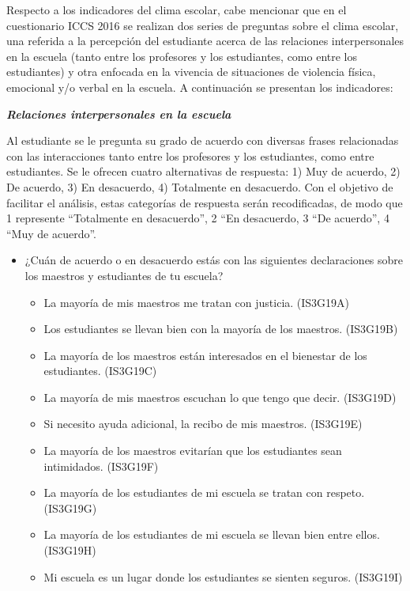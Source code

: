 \documentclass[12pt,twoside]{templates/facsothesis}
\providecommand{\tightlist}{%
  \setlength{\itemsep}{0pt}\setlength{\parskip}{0pt}}
\begin{document}
Respecto a los indicadores del clima escolar, cabe mencionar que en el cuestionario ICCS 2016 se realizan dos series de preguntas sobre el clima escolar, una referida a la percepción del estudiante acerca de las relaciones interpersonales en la escuela (tanto entre los profesores y los estudiantes, como entre los estudiantes) y otra enfocada en la vivencia de situaciones de violencia física, emocional y/o verbal en la escuela. A continuación se presentan los indicadores:

\textbf{\emph{Relaciones interpersonales en la escuela}}

Al estudiante se le pregunta su grado de acuerdo con diversas frases relacionadas con las interacciones tanto entre los profesores y los estudiantes, como entre estudiantes. Se le ofrecen cuatro alternativas de respuesta: 1) Muy de acuerdo, 2) De acuerdo, 3) En desacuerdo, 4) Totalmente en desacuerdo. Con el objetivo de facilitar el análisis, estas categorías de respuesta serán recodificadas, de modo que 1 represente ``Totalmente en desacuerdo'', 2 ``En desacuerdo, 3 ``De acuerdo'', 4 ``Muy de acuerdo''.

\begin{itemize}
\item
  ¿Cuán de acuerdo o en desacuerdo estás con las siguientes declaraciones sobre los maestros y estudiantes de tu escuela?

  \begin{itemize}
  \tightlist
  \item
    La mayoría de mis maestros me tratan con justicia. (IS3G19A)
  \item
    Los estudiantes se llevan bien con la mayoría de los maestros. (IS3G19B)
  \item
    La mayoría de los maestros están interesados en el bienestar de los estudiantes. (IS3G19C)
  \item
    La mayoría de mis maestros escuchan lo que tengo que decir. (IS3G19D)
  \item
    Si necesito ayuda adicional, la recibo de mis maestros. (IS3G19E)
  \item
    La mayoría de los maestros evitarían que los estudiantes sean intimidados. (IS3G19F)
  \item
    La mayoría de los estudiantes de mi escuela se tratan con respeto. (IS3G19G)
  \item
    La mayoría de los estudiantes de mi escuela se llevan bien entre ellos. (IS3G19H)
  \item
    Mi escuela es un lugar donde los estudiantes se sienten seguros. (IS3G19I)
  \end{itemize}
\end{itemize}
\end{document}
